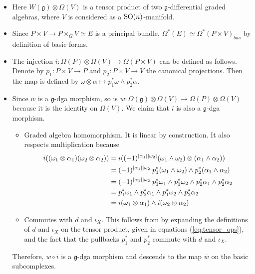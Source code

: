 \begin{itemize}
\item 
	Here $W(\mathfrak{g})\otimes \Omega(V)$ is a tensor product of two
	$\mathfrak{g}$-differential graded algebras, where $V$ is considered as
	a $\operatorname{SO}(n)$-manifold. 

\item 
Since  $P\times V \to P\times_G V \simeq E$ is a principal bundle,
$\Omega^*(E)\simeq \Omega^*(P\times V)_{bas}$ by definition of basic forms.

\item 
The injection $i:\Omega(P)\otimes\Omega(V) \to \Omega(P\times V)$ can be defined
as follows. Denote by $p_1 : P\times V \to P$ and $p_2:P\times V \to V$ the 
canonical projections. Then the map is defined by $\omega \otimes \alpha
\mapsto p_1^*\omega \wedge p_2^*\alpha$.  

\item 
Since $w$ is a  $\mathfrak{g}$-dga morphism, so is  
$w:\Omega(\mathfrak{g})\otimes\Omega(V)\to \Omega(P)\otimes\Omega(V)$ because it
is the identity on  $\Omega(V)$. We claim that $i$ is also a $\mathfrak{g}$-dga morphism. 
\begin{itemize}
	\item Graded algebra homomorphism. It is linear by construction. It also respects
		multiplication because 
	\begin{align*}
		i((\omega_1\otimes\alpha_1)(\omega_2\otimes\alpha_2))
		&= i((-1)^{\abs{\alpha_1}\abs{\omega_2}}
		(\omega_1\wedge\omega_2)\otimes(\alpha_1\wedge \alpha_2)) \\
		&= (-1)^{\abs{\alpha_1}\abs{\omega_2}}
		p_1^*(\omega_1\wedge\omega_2)\wedge p_2^*(\alpha_1\wedge \alpha_2) \\
		&= (-1)^{\abs{\alpha_1}\abs{\omega_2}}p_1^*\omega_1\wedge
		p_1^*\omega_2\wedge p_2^*\alpha_1\wedge p_2^*\alpha_2  \\
		&= p_1^*\omega_1\wedge p_2^*\alpha_1 \wedge p_1^*\omega_2\wedge p_2^*\alpha_2 \\
		&= i(\omega_1\otimes \alpha_1)\wedge i(\omega_2\otimes \alpha_2) 
	\end{align*}
	\item Commutes with $d$ and $\iota_X$. This follows from by expanding the
		definitions of $d$ and  $\iota_X$ on the tensor product, given in
		equations (\ref{eq:tensor_ops}), and the fact that the pullbacks
		$p_1^*$ and $p_2^*$ commute with  $d$ and $\iota_X$.
\end{itemize}
Therefore, $w \circ i$ is a $\mathfrak{g}$-dga morphism and descends to the map
 $\overline{w}$ on the basic subcomplexes.
\end{itemize}


